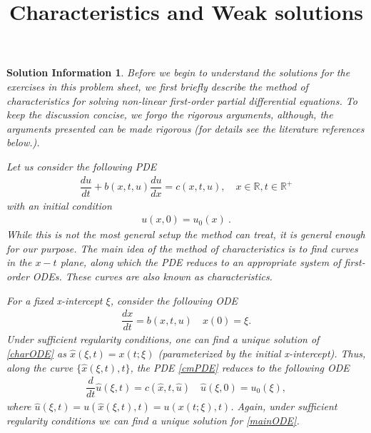 \documentclass[10pt,letterpaper]{article}
\newcommand{\frb}[1]{ \left(  {#1} \right) }
\theoremstyle{break}
\newtheorem*{solutioninformation}{Solution Information}
\begin{document}
\title{Characteristics and Weak solutions}
\date{}
\author{}

\maketitle


















\begin{solutioninformation}
	Before we begin to understand the solutions for the exercises in this problem sheet,
	we first briefly describe the method of characteristics for solving non-linear first-order partial differential equations.
	To keep the discussion concise, we forgo the rigorous arguments, although,
	the arguments presented can be made rigorous (for details see the literature references below.).

	Let us consider the following PDE
	\begin{gather} \label{cmPDE}
		\dfrac{du}{dt}+b\frb{x,t,u} \dfrac{du}{dx}=c\frb{x,t,u}, \quad x \in \mathbb{R}, t \in \mathbb{R}^+
	\end{gather}
	with an initial condition
	\begin{gather} \label{cmIC}
		u(x,0)=u_0(x)\ .
	\end{gather}
	While this is not the most general setup the method can treat, it is general enough for our purpose.
	The main idea of the method of characteristics is to find curves in the $x-t$ plane, along which the PDE reduces to an appropriate system of first-order ODEs. These curves are also known as \textit{characteristics}. 

	For a fixed x-intercept $\xi$, consider the following ODE
	\begin{gather} \label{charODE}
		\dfrac{dx}{dt} =b\frb{x,t,u}
		\quad
		x(0) = \xi.
	\end{gather}
	Under sufficient regularity conditions, one can find a unique solution of \eqref{charODE} as $\hat x (\xi,t) = x(t;\xi)$ (parameterized by the initial x-intercept). Thus, along the curve $\{\hat x (\xi,t), t\}$, the PDE \eqref{cmPDE} reduces to the following ODE
	\begin{gather} \label{mainODE}
		\dfrac{d}{dt}\hat u \frb{\xi,t}=c\frb{\hat x,t,\hat u} \quad \hat u\frb{\xi,0}=u_0\frb{\xi},
	\end{gather}
	where $\hat u(\xi,t) = u( \hat x(\xi,t),t) = u( x(t;\xi),t)$. Again, under sufficient regularity conditions we can find a unique solution for \eqref{mainODE}.


\end{solutioninformation}
\end{document}
